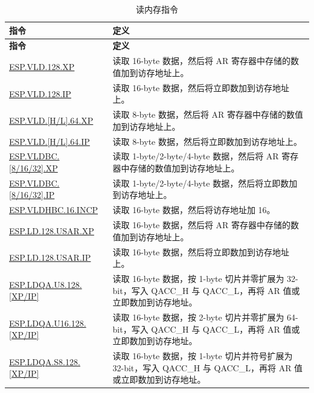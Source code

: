 \begin{longtable}[c]{|l|m{12cm}|}
    \caption{读内存指令}
    \label{tab:pie-load-instructions}\\
    \hline
    \rowcolor{lightgray}
    \textbf{指令} & \textbf{定义} \\\hline
    \endfirsthead
    \rowcolor{lightgray}
    \textbf{指令} & \textbf{定义} \\\hline
    \endhead
    \endfoot

    \hyperref[instruction:ESPVLD128XP]{ESP.VLD.128.XP} & 读取 16-byte 数据，然后将 AR 寄存器中存储的数值加到访存地址上。\\\hline
\hyperref[instruction:ESPVLD128IP]{ESP.VLD.128.IP} & 读取 16-byte 数据，然后将立即数加到访存地址上。\\\hline
\hyperref[instruction:ESPVLDH64XP]{ESP.VLD.[H/L].64.XP} & 读取 8-byte 数据，然后将 AR 寄存器中存储的数值加到访存地址上。\\\hline
\hyperref[instruction:ESPVLDH64IP]{ESP.VLD.[H/L].64.IP} & 读取 8-byte 数据，然后将立即数加到访存地址上。\\\hline
\hyperref[instruction:ESPVLDBC8XP]{ESP.VLDBC.[8/16/32].XP} & 读取 1-byte/2-byte/4-byte 数据，然后将 AR 寄存器中存储的数值加到访存地址上。\\\hline
\hyperref[instruction:ESPVLDBC8IP]{ESP.VLDBC.[8/16/32].IP} & 读取 1-byte/2-byte/4-byte 数据，然后将立即数加到访存地址上。\\\hline
\hyperref[instruction:ESPVLDHBC16INCP]{ESP.VLDHBC.16.INCP} & 读取 16-byte 数据，然后将访存地址加 16。\\\hline
\hyperref[instruction:ESPLD128USARXP]{ESP.LD.128.USAR.XP} & 读取 16-byte 数据，然后将 AR 寄存器中存储的数值加到访存地址上。\\\hline
\hyperref[instruction:ESPLD128USARIP]{ESP.LD.128.USAR.IP} & 读取 16-byte 数据，然后将立即数加到访存地址上。\\\hline
\hyperref[instruction:ESPLDQAU8128XP]{ESP.LDQA.U8.128.[XP/IP]} & 读取 16-byte 数据，按 1-byte 切片并零扩展为 32-bit，写入 QACC\_H 与 QACC\_L，再将 AR 值或立即数加到访存地址。\\\hline
\hyperref[instruction:ESPLDQAU16128XP]{ESP.LDQA.U16.128.[XP/IP]} & 读取 16-byte 数据，按 2-byte 切片并零扩展为 64-bit，写入 QACC\_H 与 QACC\_L，再将 AR 值或立即数加到访存地址。\\\hline
\hyperref[instruction:ESPLDQAS8128XP]{ESP.LDQA.S8.128.[XP/IP]} & 读取 16-byte 数据，按 1-byte 切片并符号扩展为 32-bit，写入 QACC\_H 与 QACC\_L，再将 AR 值或立即数加到访存地址。\\\hline

\end{longtable}
